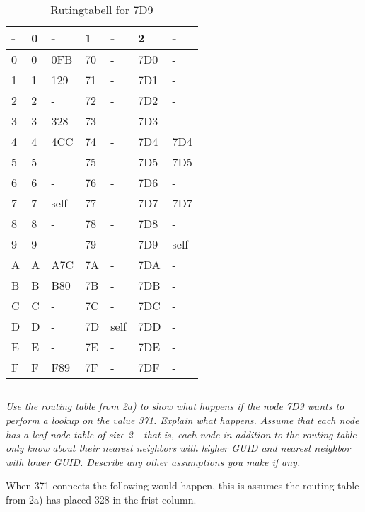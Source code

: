 \documentclass{article}
\newcommand{\question}[1]{\subsection{}\textit{#1}\bigskip}
\begin{document}
\begin{table}[h!]
    \center
    \begin{tabular}{| l | l | l | l | l | l | l |}
    \hline
    - & 0 & -    & 1  & -    & 2   & -    \\
    \hline
    0 & 0 & 0FB  & 70 & -    & 7D0 & -    \\
    \hline
    1 & 1 & 129  & 71 & -    & 7D1 & -    \\
    \hline
    2 & 2 & -    & 72 & -    & 7D2 & -    \\
    \hline
    3 & 3 & 328  & 73 & -    & 7D3 & -    \\
    \hline
    4 & 4 & 4CC  & 74 & -    & 7D4 & 7D4  \\
    \hline
    5 & 5 & -    & 75 & -    & 7D5 & 7D5  \\
    \hline
    6 & 6 & -    & 76 & -    & 7D6 & -    \\
    \hline
    7 & 7 & \cellcolor[gray]{0.8} self & 77 & -    & 7D7 & 7D7  \\
    \hline
    8 & 8 & -    & 78 & -    & 7D8 & -    \\
    \hline
    9 & 9 & -    & 79 & -    & 7D9 & \cellcolor[gray]{0.8} self \\
    \hline
    A & A & A7C  & 7A & -    & 7DA & -    \\
    \hline
    B & B & B80  & 7B & -    & 7DB & -    \\
    \hline
    C & C & -    & 7C & -    & 7DC & -    \\
    \hline
    D & D & -    & 7D & self & 7DD & -    \\
    \hline
    E & E & -    & 7E & -    & 7DE & -    \\
    \hline
    F & F & F89  & 7F & -    & 7DF & -    \\
    \hline
    \end{tabular}
    \caption{Rutingtabell for 7D9}
\end{table}


\question{Use the routing table from 2a) to show what happens if the node 7D9 wants to perform a lookup on the value 371. Explain what happens. Assume that each node has a leaf node table of size 2 - that is, each node in addition to the routing table only know about their nearest neighbors with higher GUID and nearest neighbor with lower GUID. Describe any other assumptions you make if any.}

When 371 connects the following would happen, this is assumes the routing table from 2a) has placed 328 in the frist column.
\end{document}
